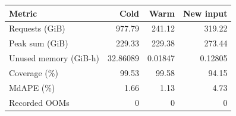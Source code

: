 \begin{tabular}{@{}lrrr@{}}
\toprule
Metric & Cold & Warm & New input\\
\midrule
Requests (GiB) & 977.79 & 241.12 & 319.22 \\
Peak sum (GiB) & 229.33 & 229.38 & 273.44 \\
Unused memory (GiB-h) & 32.86089 & 0.01847 & 0.12805 \\
Coverage (\%) & 99.53 & 99.58 & 94.15 \\
MdAPE (\%) & 1.66 & 1.13 & 4.73 \\
Recorded OOMs & 0 & 0 & 0 \\
\bottomrule
\end{tabular}
